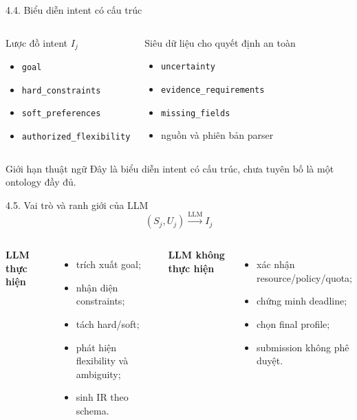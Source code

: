 \begin{frame}[t]{4.4. Biểu diễn intent có cấu trúc}
\small
\begin{columns}[T]
\begin{block}{Lược đồ intent $I_j$}
\begin{itemize}
  \item \texttt{goal}
  \item \texttt{hard\_constraints}
  \item \texttt{soft\_preferences}
  \item \texttt{authorized\_flexibility}
\end{itemize}
\end{block}
\begin{block}{Siêu dữ liệu cho quyết định an toàn}
\begin{itemize}
  \item \texttt{uncertainty}
  \item \texttt{evidence\_requirements}
  \item \texttt{missing\_fields}
  \item nguồn và phiên bản parser
\end{itemize}
\end{block}
\end{columns}
\begin{alertblock}{Giới hạn thuật ngữ}
Đây là biểu diễn intent có cấu trúc, chưa tuyên bố là một ontology đầy đủ.
\end{alertblock}
\end{frame}

\begin{frame}[t]{4.5. Vai trò và ranh giới của LLM}
\small
\[
(S_j,U_j)\xrightarrow{\mathrm{LLM}}I_j
\]
\begin{columns}[T]
\textbf{LLM thực hiện}
\begin{itemize}
  \item trích xuất goal;
  \item nhận diện constraints;
  \item tách hard/soft;
  \item phát hiện flexibility và ambiguity;
  \item sinh IR theo schema.
\end{itemize}
\textbf{LLM không thực hiện}
\begin{itemize}
  \item xác nhận resource/policy/quota;
  \item chứng minh deadline;
  \item chọn final profile;
  \item submission không phê duyệt.
\end{itemize}
\end{columns}
\end{frame}

